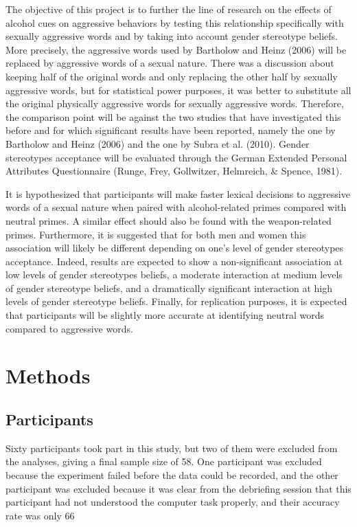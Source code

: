 \documentclass[authordate, serif, review]{jote-article}
\begin{document}
\begin{multicols}{2}
The objective of this project is to further the line of research on the effects of alcohol cues on aggressive behaviors by testing this relationship specifically with sexually aggressive words and by taking into account gender stereotype beliefs. More precisely, the aggressive words used by Bartholow and Heinz (2006) will be replaced by aggressive words of a sexual nature. There was a discussion about keeping half of the original words and only replacing the other half by sexually aggressive words, but for statistical power purposes, it was better to substitute all the original physically aggressive words for sexually aggressive words. Therefore, the comparison point will be against the two studies that have investigated this before and for which significant results have been reported, namely the one by Bartholow and Heinz (2006) and the one by Subra et al. (2010). Gender stereotypes acceptance will be evaluated through the German Extended Personal Attributes Questionnaire (Runge, Frey, Gollwitzer, Helmreich, \& Spence, 1981). 

It is hypothesized that participants will make faster lexical decisions to aggressive words of a sexual nature when paired with alcohol-related primes compared with neutral primes. A similar effect should also be found with the weapon-related primes. Furthermore, it is suggested that for both men and women this association will likely be different depending on one's level of gender stereotypes acceptance. Indeed, results are expected to show a non-significant association at low levels of gender stereotypes beliefs, a moderate interaction at medium levels of gender stereotype beliefs, and a dramatically significant interaction at high levels of gender stereotype beliefs. Finally, for replication purposes, it is expected that participants will be slightly more accurate at identifying neutral words compared to aggressive words.  

{}
\section*{Methods} \gotoreview
\label{sec:methods}
{}
\subsection*{Participants}
Sixty participants took part in this study, but two of them were excluded from the analyses, giving a final sample size of 58. One participant was excluded because the experiment failed before the data could be recorded, and the other participant was excluded because it was clear from the debriefing session that this participant had not understood the computer task properly, and their accuracy rate was only 66%


\end{multicols}
\end{document}
